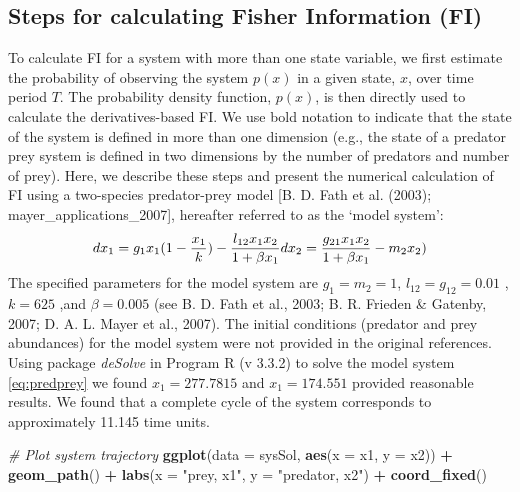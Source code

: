 \documentclass[12pt,twoside,openany]{reedthesis}
\newenvironment{Shaded}{\begin{snugshade}}{\end{snugshade}}
\newcommand{\KeywordTok}[1]{\textcolor[rgb]{0.13,0.29,0.53}{\textbf{#1}}}
\newcommand{\DataTypeTok}[1]{\textcolor[rgb]{0.13,0.29,0.53}{#1}}
\newcommand{\StringTok}[1]{\textcolor[rgb]{0.31,0.60,0.02}{#1}}
\newcommand{\CommentTok}[1]{\textcolor[rgb]{0.56,0.35,0.01}{\textit{#1}}}
\newcommand{\OperatorTok}[1]{\textcolor[rgb]{0.81,0.36,0.00}{\textbf{#1}}}
\newcommand{\NormalTok}[1]{#1}
\begin{document}
\subsection{Steps for calculating Fisher Information
(FI)}\label{steps-for-calculating-fisher-information-fi}

To calculate FI for a system with more than one state variable, we first
estimate the probability of observing the system \(p(x)\) in a given
state, \(x\), over time period \(T\). The probability density function,
\(p(x)\), is then directly used to calculate the derivatives-based FI.
We use bold notation to indicate that the state of the system is defined
in more than one dimension (e.g., the state of a predator prey system is
defined in two dimensions by the number of predators and number of
prey). Here, we describe these steps and present the numerical
calculation of FI using a two-species predator-prey model {[}B. D. Fath
et al. (2003); mayer\_applications\_2007{]}, hereafter referred to as
the `model system':
\begin{equation} 
  dx_1 = g_{1}x_{1}(1-\frac{x_1}{k})- \frac{l_{12} x_{1} x_{2}}{1+\beta x_{1}} \\
  dx_2 = \frac{g_{21}x_1 x_2}{1+\beta x_1} - m_2 x_2)
  \label{eq:predprey}
\end{equation}
The specified parameters for the model system are \(g_1=m_2=1\),
\(l_12=g_12 = 0.01\) , \(k=625\) ,and \(\beta=0.005\) (see B. D. Fath et
al., 2003; B. R. Frieden \& Gatenby, 2007; D. A. L. Mayer et al., 2007).
The initial conditions (predator and prey abundances) for the model
system were not provided in the original references. Using package
\emph{deSolve} in Program R (v 3.3.2) to solve the model system
\eqref{eq:predprey} we found \(x_1 = 277.7815\) and \(x_1= 174.551\)
provided reasonable results. We found that a complete cycle of the
system corresponds to approximately 11.145 time units.
\begin{Shaded}
\begin{Highlighting}[]
\CommentTok{# Plot system trajectory}
\KeywordTok{ggplot}\NormalTok{(}\DataTypeTok{data =}\NormalTok{ sysSol, }\KeywordTok{aes}\NormalTok{(}\DataTypeTok{x =}\NormalTok{ x1, }\DataTypeTok{y =}\NormalTok{ x2)) }\OperatorTok{+}
\StringTok{  }\KeywordTok{geom_path}\NormalTok{() }\OperatorTok{+}
\StringTok{  }\KeywordTok{labs}\NormalTok{(}\DataTypeTok{x =} \StringTok{"prey, x1"}\NormalTok{, }\DataTypeTok{y =} \StringTok{"predator, x2"}\NormalTok{) }\OperatorTok{+}
\StringTok{  }\KeywordTok{coord_fixed}\NormalTok{()}
\end{Highlighting}
\end{Shaded}
\end{document}
